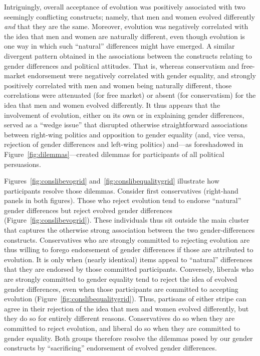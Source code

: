\documentclass[fignum,man]{apa}\usepackage[]{graphicx}\usepackage[]{color}
\begin{document}
Intriguingly, overall acceptance of evolution was 
positively associated with two seemingly conflicting constructs; 
namely, that men and women evolved differently \textit{and} that they are
the same. Moreover, evolution was negatively correlated with the idea
that men and women are naturally different, even though evolution
is one way in which such ``natural'' differences might have emerged.
A similar divergent pattern obtained in the associations between
the constructs relating to gender differences and political 
attitudes. That is, whereas conservatism and free-market endorsement
were negatively correlated with gender equality, 
and strongly
positively correlated with men and women being naturally different, those
correlations were attenuated (for free market) or absent (for conservatism) 
for the idea that men and women evolved differently.
It thus appears that the involvement of evolution, either on its own or in explaining
gender differences, served as a ``wedge issue'' that disrupted
otherwise straightforward associations between right-wing politics
and opposition to gender equality (and, vice versa, rejection of
gender differences and left-wing politics) and---as foreshadowed
in Figure~\ref{fig:dilemmas}---created 
dilemmas for participants of all political persuasions.

Figures~\ref{fig:conslibevogrid} and~\ref{fig:conslibequalitygrid} illustrate
how participants resolve those dilemmas. 
Consider first conservatives (right-hand panels in both figures). 
Those who reject evolution tend to endorse ``natural'' gender differences
but reject evolved gender differences (Figure~\ref{fig:conslibevogrid}). These
individuals thus sit outside
the main cluster that captures the
otherwise strong association between the two gender-differences constructs.
Conservatives who are strongly committed to rejecting evolution
are thus willing to forego endorsement of gender differences if 
those are attributed to evolution. It is only when (nearly identical)
items appeal to ``natural'' differences that they are endorsed by 
those committed participants.
Conversely, liberals who are strongly committed to gender equality
tend to reject the idea of evolved gender differences, even
when those participants are committed to accepting evolution (Figure~\ref{fig:conslibequalitygrid}). 
Thus, partisans of either stripe can agree in their rejection of the idea that men and
women evolved differently, but they do so for entirely different
reasons. Conservatives do so when they are committed to reject evolution, and liberal do so when they are committed to gender equality. Both groups therefore resolve the dilemmas
posed by our gender constructs by ``sacrificing'' endorsement of evolved gender
differences.
\end{document}

